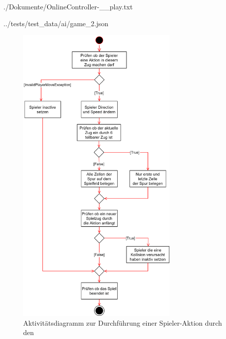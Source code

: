 \begin{minipage}{\textwidth}
	
	{./Dokumente/OnlineController-__play.txt}
\end{minipage}

\begin{minipage}{\textwidth}
	
	{../tests/test_data/ai/game_2.json}
\end{minipage}

\begin{figure}[htb]
	\centering
	\includegraphics[width=0.7\textwidth]{Bilder/game_service_do_action_activity_diagram.png}
	\caption{Aktivitätsdiagramm zur Durchführung einer Spieler-Aktion durch den }
	\label{fig:aktivitaetsdiagramm-spieleraktion-gameservice}
\end{figure}

